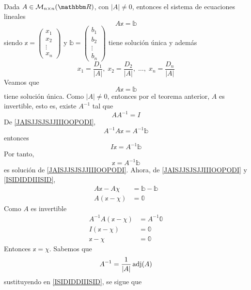 \begin{theorem}
    Dada $A \in \mathcal{M}_{n \times n}(\RR)$, con $|A| \neq 0$, entonces el sistema de ecuaciones lineales
    $$A \mathbb{x} = \mathbb{b}$$
    siendo $\mathbb{x} = \begin{pmatrix}
        x_1 \\
        x_2 \\
        \vdots \\
        x_n
    \end{pmatrix}$ y $\mathbb{b} = \begin{pmatrix}
        b_1 \\
        b_2 \\
        \vdots \\
        b_n
    \end{pmatrix}$ tiene solución única y además
    $$x_1 = \frac{D_1}{|A|}, \; x_2 = \frac{D_2}{|A|}, \; \dots, \; x_n = \frac{D_n}{|A|}$$
    \demostracion
    Veamos que
    \begin{equation}
        A \mathbb{x} = \mathbb{b} \label{JAISJJSJSJJIIIOOPODI}
    \end{equation}
    tiene solución única. Como $|A| \neq 0$, entonces por el teorema anterior, $A$ es invertible, esto es, existe $A^{-1}$ tal que
    $$AA^{-1} = I$$
    De \eqref{JAISJJSJSJJIIIOOPODI},
    $$A^{-1}A \mathbb{x} = A^{-1} \mathbb{b}$$
    entonces
    $$I \mathbb{x} = A^{-1} \mathbb{b}$$
    Por tanto,
    \begin{equation}
        \mathbb{x} = A^{-1} \mathbb{b} \label{ISIDIDDIIISID}
    \end{equation}
    es solución de \eqref{JAISJJSJSJJIIIOOPODI}. Ahora, de \eqref{JAISJJSJSJJIIIOOPODI} y \eqref{ISIDIDDIIISID},
    \begin{align*}
        A\mathbb{x} - A\mathbb{\chi} & = \mathbb{b} - \mathbb{b} \\
        A(\mathbb{x} - \mathbb{\chi}) & = \mathbb{0}
    \end{align*}
    Como $A$ es invertible
    \begin{align*}
        A^{-1}A(\mathbb{x} - \mathbb{\chi}) & = A^{-1} \mathbb{0} \\
        I(\mathbb{x} - \mathbb{\chi}) & = \mathbb{0} \\
        \mathbb{x} - \mathbb{\chi} & = \mathbb{0}
    \end{align*}
    Entonces $\mathbb{x} = \mathbb{\chi}$. Sabemos que
    $$\displaystyle A^{-1} = \frac{1}{|A|} \operatorname{adj}(A)$$
    sustituyendo en \eqref{ISIDIDDIIISID}, se sigue que

\end{theorem}
